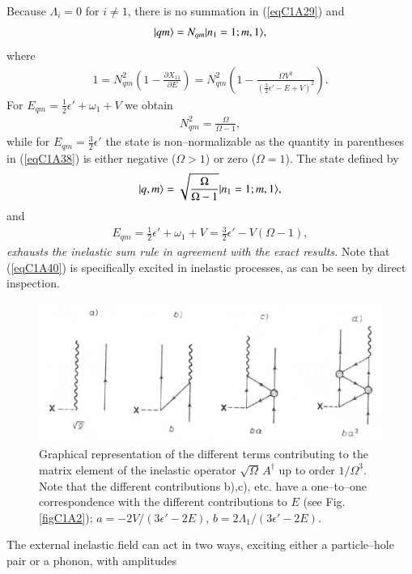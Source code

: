Because $\Lambda_i=0$ for $i\neq 1$, there is no summation in (\ref{eqC1A29}) and
 \begin{align}\label{eqC1A37} 
|{qm} \rangle=N_{qm}|{n_1=1;m,1} \rangle,
 \end{align}
where
 \begin{align}\label{eqC1A38} 
1=N^2_{qm}\left(1-\frac{\partial X_{11}}{\partial E}\right)=N^2_{qm}\left(1-\frac{\Omega V^2}{\left(\frac{3}{2}\epsilon'-E+V\right)^2}\right).
 \end{align}
For $E_{qm}=\frac{1}{2}\epsilon'+\omega_1+V$ we obtain
 \begin{align}\label{eqC1A39} 
 N^2_{qm}=\frac{\Omega}{\Omega-1},
 \end{align}
while for $E_{qm}=\frac{3}{2}\epsilon'$ the state is non--normalizable as the quantity in parentheses
in (\ref{eqC1A38}) is either negative ($\Omega>1$) or zero ($\Omega=1$).
The state defined by
 \begin{align}\label{eqC1A40} 
|{q,m} \rangle=\sqrt{\frac{\Omega}{\Omega-1}}|{n_1=1;m,1} \rangle,
 \end{align}
and 
 \begin{align}\label{eqC1A41} 
E_{qm}=\frac{1}{2}\epsilon'+\omega_1+V=\frac{3}{2}\epsilon'-V(\Omega-1),
 \end{align}
\textit{exhausts the inelastic sum rule in agreement with the exact results.} Note
that (\ref{eqC1A40}) is specifically excited in inelastic processes, as can be seen by
direct inspection.
  \begin{figure}
  \centerline {
  \includegraphics*[width=12cm]{introduccion/figs/fig20}
  }
  \caption{Graphical representation of the different terms contributing to the matrix element of the inelastic operator $\sqrt{\Omega}\,A^\dagger$ up to order $1/\Omega^3$. Note that the different contributions b),c), etc. have a one--to--one correspondence with the different contributions to $E$ (see Fig. \ref{figC1A2}); $a=-2V/(3\epsilon'-2E),\,b=2\Lambda_1/(3\epsilon'-2E)$.}
  \label{figC1A3}
  \end{figure}
The external inelastic field can act in two ways, exciting either a particle--hole pair or a phonon, with amplitudes 
